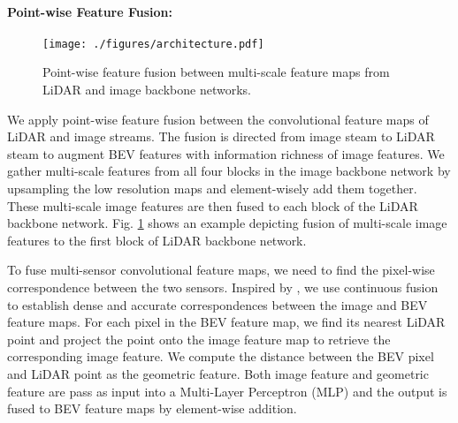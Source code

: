 \documentclass[10pt,twocolumn,letterpaper]{article}
\begin{document}
\paragraph{Point-wise Feature Fusion:}
\begin{figure}[t]
\begin{center}
\texttt{[image: ./figures/architecture.pdf]}
\end{center}
   \caption{Point-wise feature fusion between multi-scale feature maps from LiDAR and image backbone networks.}
\label{fig:point}
\end{figure}


We apply point-wise feature fusion between the convolutional feature maps of LiDAR and image streams. The fusion is directed from image steam to LiDAR steam to augment BEV features with information richness of image features. We gather multi-scale features from all four blocks in the image backbone network by upsampling the low resolution maps and element-wisely add them together. These multi-scale image features are then fused to each block of the LiDAR backbone network. Fig. \ref{fig:point} shows an example depicting fusion of multi-scale image features to the first block of LiDAR backbone network.

To fuse multi-sensor convolutional feature maps, we need to find the pixel-wise correspondence between the two sensors. Inspired by \cite{contfuse}, we use continuous fusion to establish  dense and accurate correspondences between the image and BEV feature maps. For each pixel in the BEV feature map, we find its nearest LiDAR point and project the point onto the image feature map to retrieve the corresponding image feature.  We  compute the distance between the BEV pixel and LiDAR point as the geometric feature. Both image feature and geometric feature are pass as input into a Multi-Layer Perceptron (MLP) and the output is fused to BEV feature maps by element-wise addition.
\end{document}
